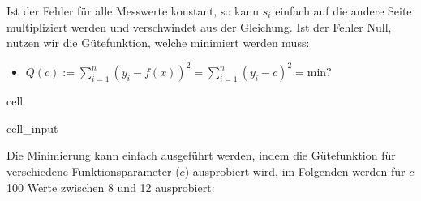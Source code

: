 \documentclass[letterpaper,10pt,english]{jupyterBook}
\begin{document}
\sphinxAtStartPar
Ist der Fehler für alle Messwerte konstant, so kann \(s_i\) einfach auf die andere Seite multipliziert werden und verschwindet aus der Gleichung. Ist der Fehler Null, nutzen wir die Gütefunktion, welche minimiert werden muss:
\begin{itemize}
\item {} 
\sphinxAtStartPar
\(Q(c) := \sum_{i=1}^n (y_i - f(x))^2 = \sum_{i=1}^n (y_i - c)^2 = \textrm{min?}\)

\end{itemize}

\begin{sphinxuseclass}{cell}\begin{sphinxVerbatimInput}

\begin{sphinxuseclass}{cell_input}
\begin{sphinxVerbatim}[commandchars=\\\{\}]
  
       

  
     
\end{sphinxVerbatim}

\end{sphinxuseclass}\end{sphinxVerbatimInput}

\end{sphinxuseclass}
\sphinxAtStartPar
Die Minimierung kann einfach ausgeführt werden, indem die Gütefunktion für verschiedene Funktionsparameter (\(c\)) ausprobiert wird, im Folgenden werden für \(c\) 100 Werte zwischen 8 und 12 ausprobiert:
\end{document}
